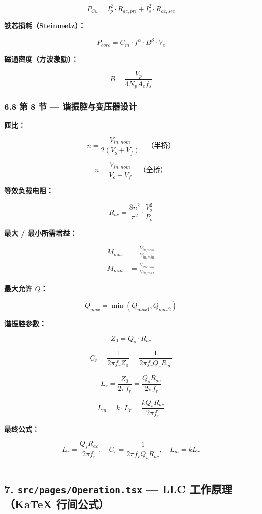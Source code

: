 \documentclass[UTF8]{ctexart}
\begin{document}
\[
P_{Cu} = I_p^2 \cdot R_{ac,pri} + I_s^2 \cdot R_{ac,sec}
\]

\textbf{铁芯损耗（Steinmetz）：}

\[
P_{core} = C_m \cdot f^\alpha \cdot B^\beta \cdot V_e
\]

\textbf{磁通密度（方波激励）：}

\[
B = \frac{V_p}{4 N_p A_e f_s}
\]

\subsubsection*{6.8 第 8 节 — 谐振腔与变压器设计}

\textbf{匝比：}

\[
n = \frac{V_{in,nom}}{2(V_o + V_f)} \quad \text{（半桥）}
\]

\[
n = \frac{V_{in,nom}}{V_o + V_f} \quad \text{（全桥）}
\]

\textbf{等效负载电阻：}

\[
R_{ac} = \frac{8n^2}{\pi^2} \cdot \frac{V_o^2}{P_o}
\]

\textbf{最大 / 最小所需增益：}

\[
\begin{aligned}
M_{max} &= \frac{V_{in,nom}}{V_{in,min}} \\ M_{min} &= \frac{V_{in,nom}}{V_{in,max}}
\end{aligned}
\]

\textbf{最大允许 \(Q\)：}

\[
Q_{max} = \min(Q_{max1}, Q_{max2})
\]

\textbf{谐振腔参数：}

\[
Z_0 = Q_s \cdot R_{ac}
\]

\[
C_r = \frac{1}{2\pi f_r Z_0} = \frac{1}{2\pi f_r Q_s R_{ac}}
\]

\[
L_r = \frac{Z_0}{2\pi f_r} = \frac{Q_s R_{ac}}{2\pi f_r}
\]

\[
L_m = k \cdot L_r = \frac{k Q_s R_{ac}}{2\pi f_r}
\]

\textbf{最终公式：}

\[
L_r = \frac{Q_s R_{ac}}{2\pi f_r}, \quad C_r = \frac{1}{2\pi f_r Q_s R_{ac}}, \quad L_m = k L_r
\]

\noindent\rule{\textwidth}{0.4pt}

\subsection*{7. \texttt{src/pages/Operation.tsx} — LLC 工作原理（KaTeX 行间公式）}
\end{document}
